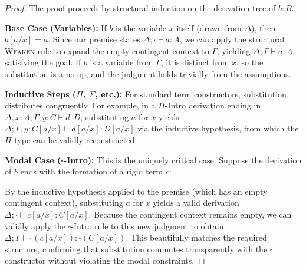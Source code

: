 \begin{proof}
The proof proceeds by structural induction on the derivation tree of $b : B$. 

\textbf{Base Case (Variables):} If $b$ is the variable $x$ itself (drawn from $\Delta$), then $b[a/x] = a$. Since our premise states $\Delta; \cdot \vdash a : A$, we can apply the structural \textsc{Weaken} rule to expand the empty contingent context to $\Gamma$, yielding $\Delta; \Gamma \vdash a : A$, satisfying the goal. If $b$ is a variable from $\Gamma$, it is distinct from $x$, so the substitution is a no-op, and the judgment holds trivially from the assumptions.

\textbf{Inductive Steps ($\Pi$, $\Sigma$, etc.):} For standard term constructors, substitution distributes congruently. For example, in a $\Pi$-Intro derivation ending in $\Delta, x:A; \Gamma, y:C \vdash d : D$, substituting $a$ for $x$ yields $\Delta; \Gamma, y:C[a/x] \vdash d[a/x] : D[a/x]$ via the inductive hypothesis, from which the $\Pi$-type can be validly reconstructed.

\textbf{Modal Case ($\square$-Intro):} This is the uniquely critical case. Suppose the derivation of $b$ ends with the formation of a rigid term $c$:
\begin{mathpar}
\end{mathpar}
By the inductive hypothesis applied to the premise (which has an empty contingent context), substituting $a$ for $x$ yields a valid derivation $\Delta; \cdot \vdash c[a/x] : C[a/x]$. Because the contingent context remains empty, we can validly apply the $\square$-Intro rule to this new judgment to obtain $\Delta; \Gamma \vdash \square(c[a/x]) : \square(C[a/x])$. This beautifully matches the required structure, confirming that substitution commutes transparently with the $\square$ constructor without violating the modal constraints.
\end{proof}

